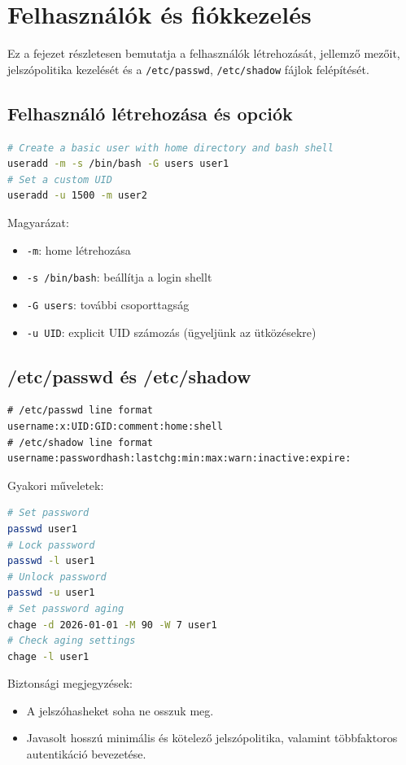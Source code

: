 \section{Felhasználók és fiókkezelés}

Ez a fejezet részletesen bemutatja a felhasználók létrehozását, jellemző mezőit, jelszópolitika kezelését és a \texttt{/etc/passwd}, \texttt{/etc/shadow} fájlok felépítését.

\subsection{Felhasználó létrehozása és opciók}
\begin{lstlisting}[language=bash]
# Create a basic user with home directory and bash shell
useradd -m -s /bin/bash -G users user1
# Set a custom UID
useradd -u 1500 -m user2
\end{lstlisting}

Magyarázat:
\begin{itemize}
  \item \texttt{-m}: home létrehozása
  \item \texttt{-s /bin/bash}: beállítja a login shellt
  \item \texttt{-G users}: további csoporttagság
  \item \texttt{-u UID}: explicit UID számozás (ügyeljünk az ütközésekre)
\end{itemize}

\subsection{/etc/passwd és /etc/shadow}
\begin{verbatim}
# /etc/passwd line format
username:x:UID:GID:comment:home:shell
# /etc/shadow line format
username:passwordhash:lastchg:min:max:warn:inactive:expire:
\end{verbatim}

Gyakori műveletek:
\begin{lstlisting}[language=bash]
# Set password
passwd user1
# Lock password
passwd -l user1
# Unlock password
passwd -u user1
# Set password aging
chage -d 2026-01-01 -M 90 -W 7 user1
# Check aging settings
chage -l user1
\end{lstlisting}

Biztonsági megjegyzések:
\begin{itemize}
  \item A jelszóhasheket soha ne osszuk meg.
  \item Javasolt hosszú minimális és kötelező jelszópolitika, valamint többfaktoros autentikáció bevezetése.
\end{itemize}
